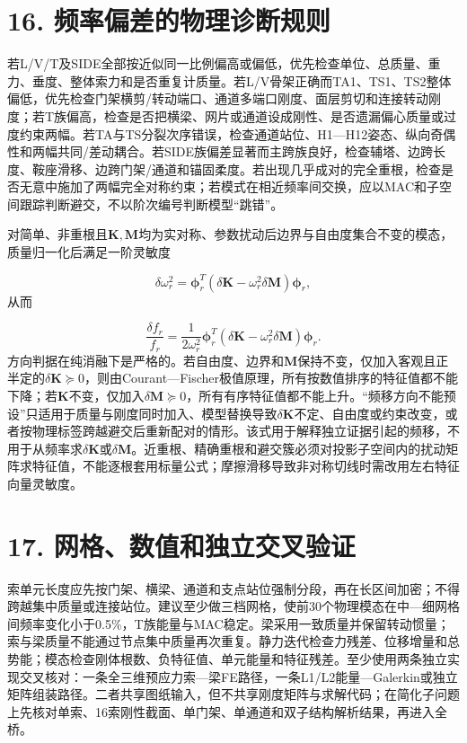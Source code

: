 \documentclass[UTF8,a4paper,11pt,fontset=none]{ctexart}
\begin{document}
\section*{16. 频率偏差的物理诊断规则}
若L/V/T及SIDE全部按近似同一比例偏高或偏低，优先检查单位、总质量、重力、垂度、整体索力和是否重复计质量。若L/V骨架正确而TA1、TS1、TS2整体偏低，优先检查门架横剪/转动端口、通道多端口刚度、面层剪切和连接转动刚度；若T族偏高，检查是否把横梁、网片或通道设成刚性、是否遗漏偏心质量或过度约束两幅。若TA与TS分裂次序错误，检查通道站位、H1—H12姿态、纵向奇偶性和两幅共同/差动耦合。若SIDE族偏差显著而主跨族良好，检查辅塔、边跨长度、鞍座滑移、边跨门架/通道和锚固柔度。若出现几乎成对的完全重根，检查是否无意中施加了两幅完全对称约束；若模式在相近频率间交换，应以MAC和子空间跟踪判断避交，不以阶次编号判断模型“跳错”。\par
对简单、非重根且\(\mathbf K,\allowbreak \mathbf M\)\allowbreak{}均为实对称、参数扰动后边界与自由度集合不变的模态，质量归一化后满足一阶灵敏度\par
\[
\delta\omega_r^2=
\boldsymbol\phi_r^T
\left(\delta\mathbf K-
\omega_r^2\delta\mathbf M\right)
\boldsymbol\phi_r,
\]
从而\par
\[
\frac{\delta f_r}{f_r}
=\frac{1}{2\omega_r^2}
\boldsymbol\phi_r^T
\left(\delta\mathbf K-
\omega_r^2\delta\mathbf M\right)
\boldsymbol\phi_r.
\]
方向判据在纯消融下是严格的。若自由度、边界和\(\mathbf M\)\allowbreak{}保持不变，仅加入客观且正半定的\(\delta\mathbf K\succeq0\)\allowbreak{}，则由Courant—Fischer极值原理，所有按数值排序的特征值都不能下降；若\(\mathbf K\)\allowbreak{}不变，仅加入\(\delta\mathbf M\succeq0\)\allowbreak{}，所有有序特征值都不能上升。“频移方向不能预设”只适用于质量与刚度同时加入、模型替换导致\(\delta\mathbf K\)\allowbreak{}不定、自由度或约束改变，或者按物理标签跨越避交后重新配对的情形。该式用于解释独立证据引起的频移，不用于从频率求\(\delta\mathbf K\)\allowbreak{}或\(\delta\mathbf M\)\allowbreak{}。近重根、精确重根和避交簇必须对投影子空间内的扰动矩阵求特征值，不能逐根套用标量公式；摩擦滑移导致非对称切线时需改用左右特征向量灵敏度。\par
{}
\section*{17. 网格、数值和独立交叉验证}
索单元长度应先按门架、横梁、通道和支点站位强制分段，再在长区间加密；不得跨越集中质量或连接站位。建议至少做三档网格，使前30个物理模态在中—细网格间频率变化小于0.5\%，T族能量与MAC稳定。梁采用一致质量并保留转动惯量；索与梁质量不能通过节点集中质量再次重复。静力迭代检查力残差、位移增量和总势能；模态检查刚体根数、负特征值、单元能量和特征残差。至少使用两条独立实现交叉核对：一条全三维预应力索—梁FE路径，一条L1/L2能量—Galerkin或独立矩阵组装路径。二者共享图纸输入，但不共享刚度矩阵与求解代码；在简化子问题上先核对单索、16索刚性截面、单门架、单通道和双子结构解析结果，再进入全桥。\par
{}
\end{document}

